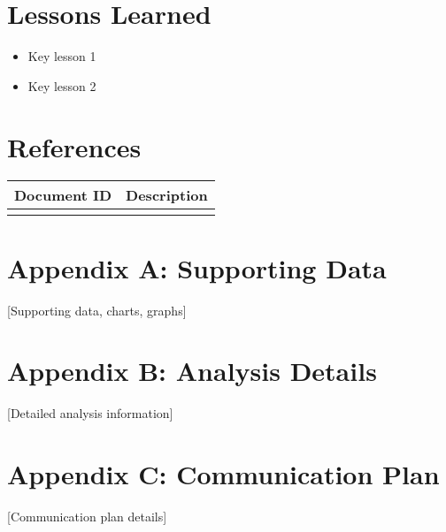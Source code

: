 \documentclass[12pt,letterpaper]{article}
\begin{document}
\section{Lessons Learned}
\begin{itemize}[leftmargin=1.5cm]
    \item Key lesson 1
    \item Key lesson 2
\end{itemize}

\clearpage
\section{References}
\begin{longtable}{|>{\raggedright\arraybackslash}p{}|>{\raggedright\arraybackslash}p{}|}
\hline
\textbf{Document ID} & \textbf{Description} \\
\hline
[Doc ID] & [Description] \\
\hline
\end{longtable}

\clearpage

\appendix
\section{Appendix A: Supporting Data}
[Supporting data, charts, graphs]

\section{Appendix B: Analysis Details}
[Detailed analysis information]

\section{Appendix C: Communication Plan}
[Communication plan details]
\end{document}
